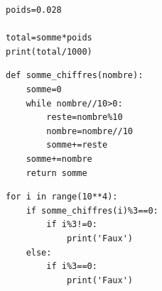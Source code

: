 \begin{verbatim}
poids=0.028

total=somme*poids
print(total/1000)
\end{verbatim}

\reponse{}

\begin{verbatim}
def somme_chiffres(nombre):
    somme=0
    while nombre//10>0:
        reste=nombre%10
        nombre=nombre//10
        somme+=reste
    somme+=nombre
    return somme
\end{verbatim}


\reponse{}

\begin{verbatim}
for i in range(10**4):
    if somme_chiffres(i)%3==0:
        if i%3!=0:
            print('Faux')
    else:
        if i%3==0:
            print('Faux')
\end{verbatim}

